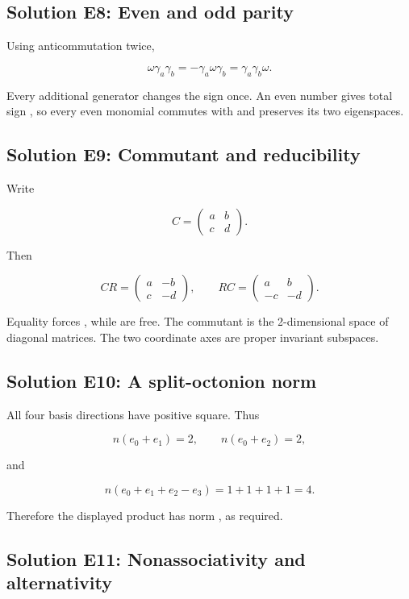 \documentclass[11pt]{article}
\begin{document}
\subsection{Solution E8: Even and odd parity}

Using anticommutation twice,

\[
\omega\gamma_a\gamma_b
=-\gamma_a\omega\gamma_b
=\gamma_a\gamma_b\omega.
\]

Every additional generator changes the sign once. An even number gives total sign \texttt{}, so every even monomial commutes with \texttt{} and preserves its two eigenspaces.

\subsection{Solution E9: Commutant and reducibility}

Write

\[
C=\begin{pmatrix}a&b\\c&d\end{pmatrix}.
\]

Then

\[
CR=\begin{pmatrix}a&-b\\c&-d\end{pmatrix},
\qquad
RC=\begin{pmatrix}a&b\\-c&-d\end{pmatrix}.
\]

Equality forces \texttt{}, while \texttt{} are free. The commutant is the 2-dimensional space of diagonal matrices. The two coordinate axes are proper invariant subspaces.

\subsection{Solution E10: A split-octonion norm}

All four basis directions \texttt{} have positive square. Thus

\[
n(e_0+e_1)=2,
\qquad n(e_0+e_2)=2,
\]

and

\[
n(e_0+e_1+e_2-e_3)=1+1+1+1=4.
\]

Therefore the displayed product has norm \texttt{}, as required.

\subsection{Solution E11: Nonassociativity and alternativity}
\end{document}
